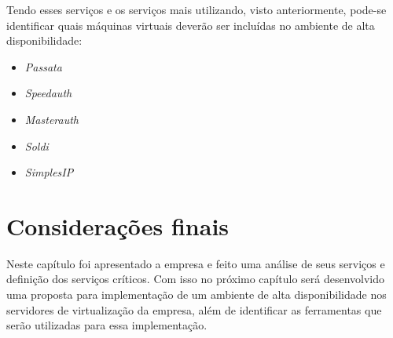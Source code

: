 Tendo esses serviços e os serviços mais utilizando, visto anteriormente, pode-se identificar quais máquinas virtuais deverão ser incluídas no 
ambiente de alta disponibilidade:
\begin{itemize}
 \item \textit{Passata}
 \item \textit{Speedauth}
 \item \textit{Masterauth}
 \item \textit{Soldi}
 \item \textit{SimplesIP}
\end{itemize}

\section{Considerações finais}

Neste capítulo foi apresentado a empresa e feito uma análise de seus serviços e definição dos serviços críticos. Com isso no próximo capítulo 
será desenvolvido uma proposta para implementação de um ambiente de alta disponibilidade nos servidores de virtualização da empresa, além de 
identificar as ferramentas que serão utilizadas para essa implementação.



